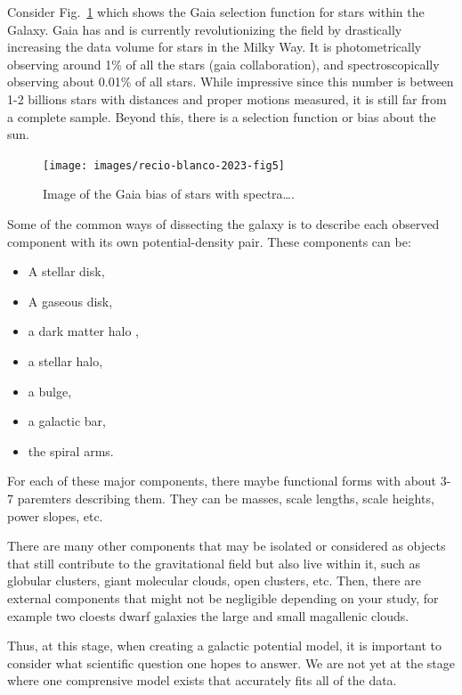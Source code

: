         Consider Fig.~\ref{fig:gaia_selection_function} which shows the Gaia selection function for stars within the Galaxy. Gaia has and is currently revolutionizing the field by drastically increasing the data volume for stars in the Milky Way. It is photometrically observing around 1\% of all the stars (gaia collaboration), and spectroscopically observing about 0.01\% of all stars. While impressive since this number is between 1-2 billions stars with distances and proper motions measured, it is still far from a complete sample. Beyond this, there is a selection function or bias about the sun. 
        \begin{figure}
            \texttt{[image: images/recio-blanco-2023-fig5]}
            \caption{Image of the Gaia bias of stars with spectra\dots \citep{2023A&A...674A..38G}.}
            \label{fig:gaia_selection_function}
        \end{figure}
        Some of the common ways of dissecting the galaxy is to describe each observed component with its own potential-density pair. These components can be: 
        \begin{itemize}
            \item A stellar disk,
            \item A gaseous disk,
            \item a dark matter halo ,
            \item a stellar halo,
            \item a bulge,
            \item a galactic bar,
            \item the spiral arms.
        \end{itemize}
        For each of these major components, there maybe functional forms with about 3-7 paremters describing them. They can be masses, scale lengths, scale heights, power slopes, etc. 
        
        There are many other components that may be isolated or considered as objects that still contribute to the gravitational field but also live within it, such as globular clusters, giant molecular clouds, open clusters, etc. Then, there are external components that might not be negligible depending on your study, for example two cloests dwarf galaxies the large and small magallenic clouds. 

        Thus, at this stage, when creating a galactic potential model, it is important to consider what scientific question one hopes to answer. We are not yet at the stage where one comprensive model exists that accurately fits all of the data. 
        
